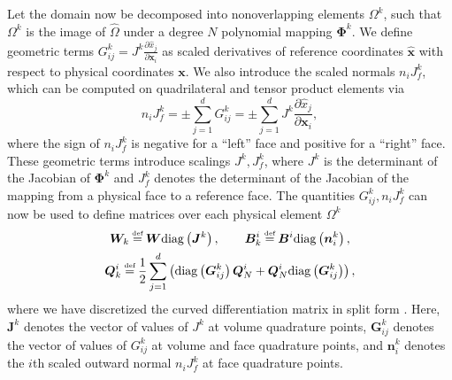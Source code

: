 \documentclass[review,onefignum,onetabnum,final]{siamart171218}
\renewcommand{\hat}{\widehat}
\newcommand{\pd}[2]{\frac{\partial#1}{\partial#2}}
\newcommand{\LRp}[1]{\left( #1 \right)}
\newcommand{\diag}[1]{{\rm diag}\LRp{#1}}
\newcommand\myeq{\mathrel{\stackrel{\makebox[0pt]{\mbox{\normalfont\tiny def}}}{=}}}
\begin{document}
Let the domain now be decomposed into nonoverlapping elements $\Omega^k$, such that $\Omega^k$ is the image of $\hat{\Omega}$ under a degree $N$ polynomial mapping $\bm{\Phi}^k$.  We define geometric terms ${G}^k_{ij} = J^k\pd{\hat{x}_j}{\bm{x}_i}$ as scaled derivatives of reference coordinates $\hat{\bm{x}}$ with respect to physical coordinates $\bm{x}$.  We also introduce the scaled normals $n_iJ^k_f$, which can be computed on quadrilateral and tensor product elements via
\[
n_i J^k_f =\pm \sum_{j=1}^d G^k_{ij} = \pm \sum_{j=1}^d  J^k\pd{\hat{x}_j}{\bm{x}_i},
\]
where the sign of $n_i J^k_f$ is negative for a ``left'' face and positive for a ``right'' face.  
These geometric terms introduce scalings $J^k, J^k_f$, where $J^k$ is the determinant of the Jacobian of $\bm{\Phi}^k$ and $J^k_f$ denotes the determinant of the Jacobian of the mapping from a physical face to a reference face.  The quantities $G^k_{ij}, n_iJ^k_f$ can now be used to define matrices over each physical element $\Omega^k$ 
\begin{gather}
\bm{W}_k \myeq \bm{W} \diag{\bm{J}^k}, \qquad \bm{B}^i_k \myeq \bm{B}^i \diag{\bm{n}^k_i }, \nonumber\\
\bm{Q}^i_k \myeq \frac{1}{2} \sum_{j=1}^d \LRp{\diag{{\bm{G}}^k_{ij}}\bm{Q}^i_N  + \bm{Q}^i_N \diag{{\bm{G}}^k_{ij}} } \label{eq:splitcurv},
\end{gather}
where we have discretized the curved differentiation matrix in split form \cite{nordstrom2006conservative, kopriva2016geometry}.  
Here, $\bm{J}^k$ denotes the vector of values of $J^k$ at volume quadrature points, ${\bm{G}}^k_{ij}$ denotes the vector of values of ${G}^k_{ij}$ at volume and face quadrature points, and $\bm{n}^k_i$ denotes the $i$th scaled outward normal $n_i J^k_f$ at face quadrature points.  
\end{document}
